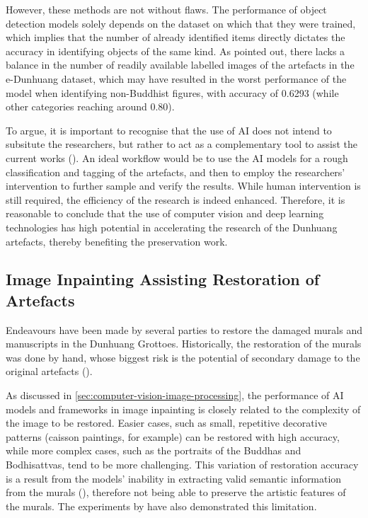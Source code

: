 However, these methods are not without flaws. The performance of object detection models solely depends on the
dataset on which that they were trained, which implies that the number of already identified items directly
dictates the accuracy in identifying objects of the same kind. As  pointed out,
there lacks a balance in the number of readily available labelled images of the artefacts in the e-Dunhuang
dataset, which may have resulted in the worst performance of the model when identifying non-Buddhist figures,
with accuracy of 0.6293 (while other categories reaching around 0.80).

To argue, it is important to recognise that the use of AI does not intend to subsitute the researchers, but rather
to act as a complementary tool to assist the current works
(). An ideal workflow would be to use the AI models for
a rough classification and tagging of the artefacts, and then to employ the researchers' intervention to further
sample and verify the results. While human intervention is still required, the efficiency of the research is indeed
enhanced. Therefore, it is reasonable to conclude that the use of computer vision and deep learning technologies
has high potential in accelerating the research of the Dunhuang artefacts, thereby benefiting the preservation
work.

\subsection{Image Inpainting Assisting Restoration of Artefacts}
\label{sec:image-inpainting-restoration}

Endeavours have been made by several parties to restore the damaged murals and manuscripts in the Dunhuang
Grottoes. Historically, the restoration of the murals was done by hand, whose biggest risk is the potential
of secondary damage to the original artefacts ().

As discussed in \cref{sec:computer-vision-image-processing}, the performance of AI models and frameworks in
image inpainting is closely related to the complexity of the image to be restored. Easier cases, such as
small, repetitive decorative patterns (caisson paintings, for example) can be restored with high accuracy,
while more complex cases, such as the portraits of the Buddhas and Bodhisattvas, tend to be more challenging.
This variation of restoration accuracy is a result from the models' inability in extracting valid semantic
information from the murals (), therefore not being able
to preserve the artistic features of the murals. The experiments by  have
also demonstrated this limitation.


